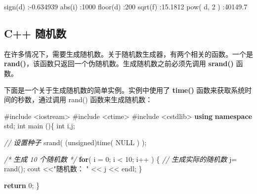 \documentclass[
]{article}
\newenvironment{Shaded}{}{}
\newcommand{\CommentTok}[1]{\textcolor[rgb]{0.38,0.63,0.69}{\textit{#1}}}
\newcommand{\ControlFlowTok}[1]{\textcolor[rgb]{0.00,0.44,0.13}{\textbf{#1}}}
\newcommand{\DataTypeTok}[1]{\textcolor[rgb]{0.56,0.13,0.00}{#1}}
\newcommand{\DecValTok}[1]{\textcolor[rgb]{0.25,0.63,0.44}{#1}}
\newcommand{\FloatTok}[1]{\textcolor[rgb]{0.25,0.63,0.44}{#1}}
\newcommand{\ImportTok}[1]{#1}
\newcommand{\KeywordTok}[1]{\textcolor[rgb]{0.00,0.44,0.13}{\textbf{#1}}}
\newcommand{\NormalTok}[1]{#1}
\newcommand{\OperatorTok}[1]{\textcolor[rgb]{0.40,0.40,0.40}{#1}}
\newcommand{\PreprocessorTok}[1]{\textcolor[rgb]{0.74,0.48,0.00}{#1}}
\newcommand{\StringTok}[1]{\textcolor[rgb]{0.25,0.44,0.63}{#1}}
\begin{document}
\begin{Shaded}
\begin{Highlighting}[]
\NormalTok{sign}\OperatorTok{(}\NormalTok{d}\OperatorTok{)} \OperatorTok{:{-}}\FloatTok{0.634939}
\NormalTok{abs}\OperatorTok{(}\NormalTok{i}\OperatorTok{)}  \OperatorTok{:}\DecValTok{1000}
\NormalTok{floor}\OperatorTok{(}\NormalTok{d}\OperatorTok{)} \OperatorTok{:}\DecValTok{200}
\NormalTok{sqrt}\OperatorTok{(}\NormalTok{f}\OperatorTok{)} \OperatorTok{:}\FloatTok{15.1812}
\NormalTok{pow}\OperatorTok{(}\NormalTok{ d}\OperatorTok{,} \DecValTok{2} \OperatorTok{)} \OperatorTok{:}\FloatTok{40149.7}
\end{Highlighting}
\end{Shaded}

\hypertarget{c-ux968fux673aux6570}{%
\subsection{C++ 随机数}\label{c-ux968fux673aux6570}}

在许多情况下，需要生成随机数。关于随机数生成器，有两个相关的函数。一个是
\textbf{rand()}，该函数只返回一个伪随机数。生成随机数之前必须先调用
\textbf{srand()} 函数。

下面是一个关于生成随机数的简单实例。实例中使用了 \textbf{time()}
函数来获取系统时间的秒数，通过调用 rand() 函数来生成随机数：

\begin{Shaded}
\begin{Highlighting}[]
\PreprocessorTok{\#include }\ImportTok{\textless{}iostream\textgreater{}}
\PreprocessorTok{\#include }\ImportTok{\textless{}ctime\textgreater{}}
\PreprocessorTok{\#include }\ImportTok{\textless{}cstdlib\textgreater{}}
\KeywordTok{using} \KeywordTok{namespace}\NormalTok{ std}\OperatorTok{;}
\DataTypeTok{int}\NormalTok{ main }\OperatorTok{()\{}
   \DataTypeTok{int}\NormalTok{ i}\OperatorTok{,}\NormalTok{j}\OperatorTok{;}
 
   \CommentTok{// 设置种子}
\NormalTok{   srand}\OperatorTok{(} \OperatorTok{(}\DataTypeTok{unsigned}\OperatorTok{)}\NormalTok{time}\OperatorTok{(}\NormalTok{ NULL }\OperatorTok{)} \OperatorTok{);}

   \CommentTok{/* 生成 10 个随机数 */}
   \ControlFlowTok{for}\OperatorTok{(}\NormalTok{ i }\OperatorTok{=} \DecValTok{0}\OperatorTok{;}\NormalTok{ i }\OperatorTok{\textless{}} \DecValTok{10}\OperatorTok{;}\NormalTok{ i}\OperatorTok{++} \OperatorTok{)}
   \OperatorTok{\{}
      \CommentTok{// 生成实际的随机数}
\NormalTok{      j}\OperatorTok{=}\NormalTok{ rand}\OperatorTok{();}
\NormalTok{      cout }\OperatorTok{\textless{}\textless{}}\StringTok{"随机数： "} \OperatorTok{\textless{}\textless{}}\NormalTok{ j }\OperatorTok{\textless{}\textless{}}\NormalTok{ endl}\OperatorTok{;}
   \OperatorTok{\}}

   \ControlFlowTok{return} \DecValTok{0}\OperatorTok{;}
\OperatorTok{\}}
\end{Highlighting}
\end{Shaded}
\end{document}
